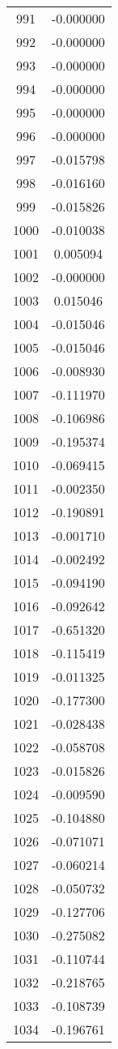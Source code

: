 \documentclass[12pt]{article}
\begin{document}
\begin{longtable}{@{}cc@{}}
991 & -0.000000 \\
992 & -0.000000 \\
993 & -0.000000 \\
994 & -0.000000 \\
995 & -0.000000 \\
996 & -0.000000 \\
997 & -0.015798 \\
998 & -0.016160 \\
999 & -0.015826 \\
1000 & -0.010038 \\
1001 & 0.005094 \\
1002 & -0.000000 \\
1003 & 0.015046 \\
1004 & -0.015046 \\
1005 & -0.015046 \\
1006 & -0.008930 \\
1007 & -0.111970 \\
1008 & -0.106986 \\
1009 & -0.195374 \\
1010 & -0.069415 \\
1011 & -0.002350 \\
1012 & -0.190891 \\
1013 & -0.001710 \\
1014 & -0.002492 \\
1015 & -0.094190 \\
1016 & -0.092642 \\
1017 & -0.651320 \\
1018 & -0.115419 \\
1019 & -0.011325 \\
1020 & -0.177300 \\
1021 & -0.028438 \\
1022 & -0.058708 \\
1023 & -0.015826 \\
1024 & -0.009590 \\
1025 & -0.104880 \\
1026 & -0.071071 \\
1027 & -0.060214 \\
1028 & -0.050732 \\
1029 & -0.127706 \\
1030 & -0.275082 \\
1031 & -0.110744 \\
1032 & -0.218765 \\
1033 & -0.108739 \\
1034 & -0.196761 \\

\end{longtable}
\end{document}
